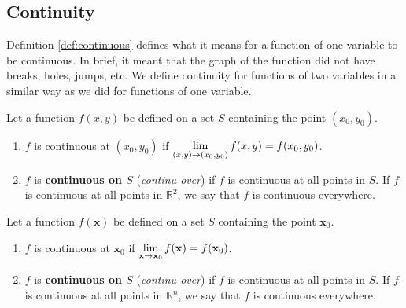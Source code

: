 \subsection{Continuity}
Definition \ref{def:continuous} defines what it means for a function of one variable to be continuous. In brief, it meant that the graph of the function did not have breaks, holes, jumps, etc. We define continuity for functions of two variables in a similar way as we did for functions of one variable.

\ifcalculus
\begin{definition}[Continuity]\label{def:multi_continuous}
Let a function $f(x,y)$ be defined on a set $S$ containing the point $(x_0,y_0)$. 

\begin{enumerate}
	\item $f$ is continuous at $(x_0,y_0)$ if $\displaystyle\lim_{(x,y)\to(x_0,y_0)} f(x,y) = f(x_0,y_0)$.
	\item	$f$ is \textbf{continuous on $S$} (\textit{continu over}) if $f$ is continuous at all points in $S$. If $f$ is continuous at all points in $\mathbb{R}^2$, we say that $f$ is continuous everywhere.
\end{enumerate}
\end{definition}
\fi

\ifanalysis
\begin{definition}[Continuity]\label{def:multi_continuous}
Let a function $f(\mathbf{x})$ be defined on a set $S$ containing the point $\mathbf{x}_0$. 

\begin{enumerate}
	\item $f$ is continuous at $\mathbf{x}_0$ if $\displaystyle\lim_{\mathbf{x}\to\mathbf{x}_0} f(\mathbf{x}) = f(\mathbf{x}_0)$.
	\item	$f$ is \textbf{continuous on $S$} (\textit{continu over}) if $f$ is continuous at all points in $S$. If $f$ is continuous at all points in $\mathbb{R}^n$, we say that $f$ is continuous everywhere.
\end{enumerate}
\end{definition}
\fi

